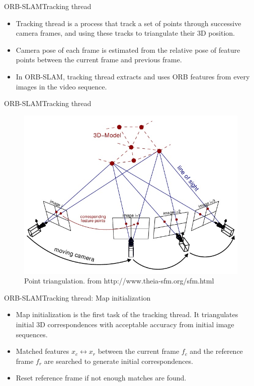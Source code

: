 \documentclass{beamer}
\begin{document}
\begin{frame}{ORB-SLAM}{Tracking thread}
    \begin{itemize}
      \item{
      Tracking thread is a process that track a set of points through successive camera frames, and using these tracks to triangulate their 3D position.
      }
      \item{
      Camera pose of each frame is estimated from the relative pose of feature points between the current frame and previous frame.
      }
      \item{
      In ORB-SLAM, tracking thread extracts and uses ORB features from every images in the video sequence.
      }  
    \end{itemize}
\end{frame}
\begin{frame}{ORB-SLAM}{Tracking thread}
\begin{figure}
\includegraphics[scale=0.35]{Figure/Triangulation}
\caption{Point triangulation. from http://www.theia-sfm.org/sfm.html}
\end{figure}
    
\end{frame}

\begin{frame}{ORB-SLAM}{Tracking thread: Map initialization}

    \begin{itemize}
    \item{
      Map initialization is the first task of the tracking thread. It triangulates initial 3D correspondences with acceptable accuracy from initial image sequences. 
      }
   \item{
   Matched features $x_{c} \leftrightarrow x_{r}$ between the current frame $f_{c}$ and the reference frame $f_{r}$ are searched to generate initial correspondences.
   }
   \item{
   Reset reference frame if not enough matches are found.
   }
   
    \end{itemize}
\end{frame}
\end{document}
